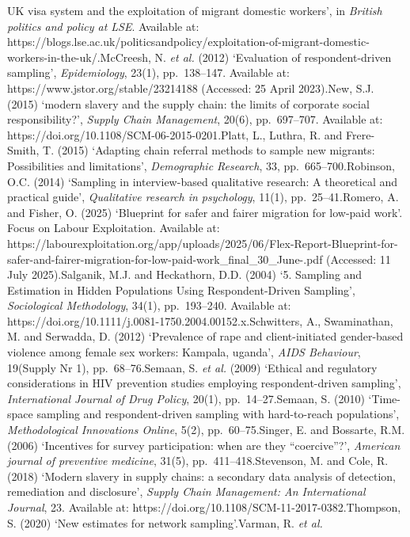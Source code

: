 \documentclass[
  12pt,
  letterpaper,
  DIV=11,
  numbers=noendperiod]{scrartcl}
\begin{document}
{{UK visa system and the exploitation of migrant domestic workers', in
\emph{British politics and policy at LSE}. Available at:
https://blogs.lse.ac.uk/politicsandpolicy/exploitation-of-migrant-domestic-workers-in-the-uk/.McCreesh,
N. \emph{et al.} (2012) `Evaluation of respondent-driven sampling',
\emph{Epidemiology}, 23(1), pp.~138--147. Available at:
https://www.jstor.org/stable/23214188 (Accessed: 25 April 2023).New,
S.J. (2015) `modern slavery and the supply chain: the limits of
corporate social responsibility?', \emph{Supply Chain Management},
20(6), pp.~697--707. Available at:
https://doi.org/10.1108/SCM-06-2015-0201.Platt, L., Luthra, R. and
Frere-Smith, T. (2015) `Adapting chain referral methods to sample new
migrants: Possibilities and limitations', \emph{Demographic Research},
33, pp.~665--700.Robinson, O.C. (2014) `Sampling in interview-based
qualitative research: A theoretical and practical guide',
\emph{Qualitative research in psychology}, 11(1), pp.~25--41.Romero, A.
and Fisher, O. (2025) `Blueprint for safer and fairer migration for
low-paid work'. Focus on Labour Exploitation. Available at:
https://labourexploitation.org/app/uploads/2025/06/Flex-Report-Blueprint-for-safer-and-fairer-migration-for-low-paid-work\_final\_30\_June-.pdf
(Accessed: 11 July 2025).Salganik, M.J. and Heckathorn, D.D. (2004) `5.
Sampling and Estimation in Hidden Populations Using Respondent-Driven
Sampling', \emph{Sociological Methodology}, 34(1), pp.~193--240.
Available at:
https://doi.org/10.1111/j.0081-1750.2004.00152.x.Schwitters, A.,
Swaminathan, M. and Serwadda, D. (2012) `Prevalence of rape and
client-initiated gender-based violence among female sex workers:
Kampala, uganda', \emph{AIDS Behaviour}, 19(Supply Nr 1),
pp.~68--76.Semaan, S. \emph{et al.} (2009) `Ethical and regulatory
considerations in HIV prevention studies employing respondent-driven
sampling', \emph{International Journal of Drug Policy}, 20(1),
pp.~14--27.Semaan, S. (2010) `Time-space sampling and respondent-driven
sampling with hard-to-reach populations', \emph{Methodological
Innovations Online}, 5(2), pp.~60--75.Singer, E. and Bossarte, R.M.
(2006) `Incentives for survey participation: when are they
``coercive''?', \emph{American journal of preventive medicine}, 31(5),
pp.~411--418.Stevenson, M. and Cole, R. (2018) `Modern slavery in supply
chains: a secondary data analysis of detection, remediation and
disclosure', \emph{Supply Chain Management: An International Journal},
23. Available at: https://doi.org/10.1108/SCM-11-2017-0382.Thompson, S.
(2020) `New estimates for network sampling'.Varman, R. \emph{et al.}
}}
\end{document}
